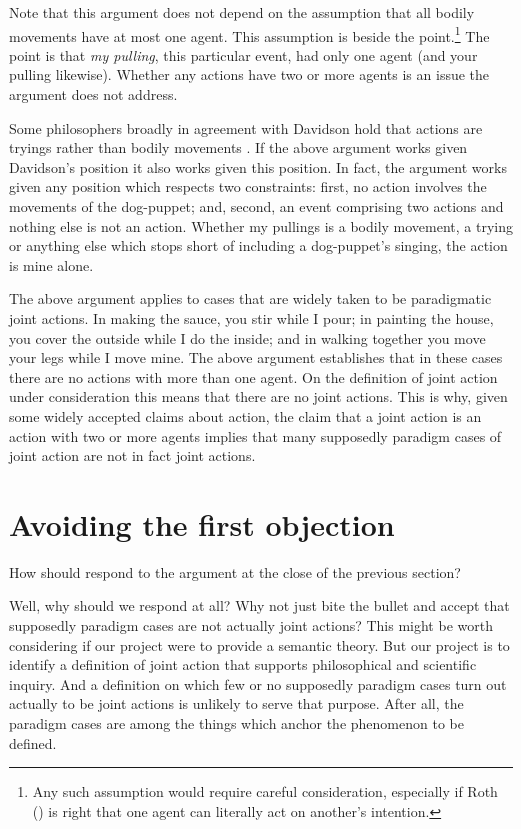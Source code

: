 \documentclass[12pt,a4paper]{extarticle}
\begin{document}
Note that this argument does not depend on the assumption that all bodily movements have at most one agent.
This assumption is beside the point.\footnote{
Any such assumption would require careful consideration, especially if Roth (\citeyear{Roth:2004ki}) is right that one agent can literally act on another's intention.
}
The point is that \emph{my pulling}, this particular event, had only one agent  (and your pulling likewise).
Whether any actions have two or more agents is an issue the argument does not address.

Some philosophers broadly in agreement with Davidson hold that actions are tryings rather than bodily movements \citep[e.g.][]{hornsby_actions_1980}.  
If the above argument works given Davidson's position it also works given this position.
In fact, the argument works given any position which respects two constraints: first, no action involves the movements of the dog-puppet; and, second, an event comprising two actions and nothing else is not an action.
Whether my pullings is a  bodily movement, a trying or anything else which stops short of including a dog-puppet's singing, the action is mine alone.

The above argument applies to cases that are widely taken to be paradigmatic joint actions.
In making the sauce, you stir while I pour;
in painting the house, you cover the outside while I do the inside; and in walking together you move your legs while I move mine.
The above argument establishes that in these cases there are no actions with more than one agent.
On the definition of joint action under consideration this means that there are no joint actions.
This is why, given some  widely accepted claims about action, the claim that a joint action is an action with two or more agents implies that many supposedly paradigm cases of joint action are not in fact joint actions.




\section{Avoiding the first objection}
How should respond to the argument at the close of the previous section?

Well, why should we respond at all?
Why not just bite the bullet and accept that supposedly paradigm cases are not actually joint actions?
This might be worth considering if our project were to provide a semantic theory.
But our project is to identify a definition of joint action that supports philosophical and scientific inquiry.
And a definition on which few or no supposedly paradigm cases turn out actually to be joint actions is unlikely to serve that purpose.
After all, the paradigm cases are among the things which anchor the phenomenon to be defined.
\end{document}
